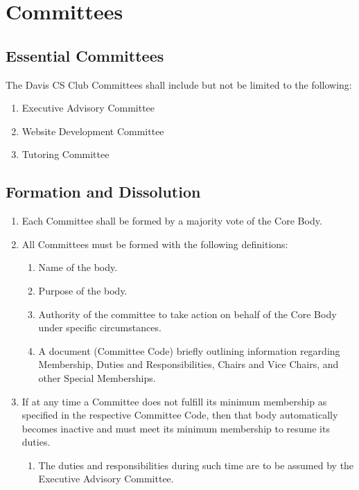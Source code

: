\documentclass{article}
\newenvironment{li}{
\begin{enumerate}
  \setlength{\itemsep}{1pt}
  \setlength{\parskip}{0pt}
  \setlength{\parsep}{0pt}
}{\end{enumerate}}
\begin{document}

\section{Committees}
\subsection{Essential Committees}
The Davis CS Club Committees shall include but not be limited to the following:
\begin{li}
\item Executive Advisory Committee
\item Website Development Committee
\item Tutoring Committee
\end{li}
\subsection{Formation and Dissolution}
\begin{li}
\item Each Committee shall be formed by a majority vote of the Core Body.
\item All Committees must be formed with the following definitions:
	\begin{li}
	\item Name of the body.
	\item Purpose of the body.
	\item Authority of the committee to take action on behalf of the Core Body under specific circumstances.
	\item A document (Committee Code) briefly outlining information regarding Membership, Duties and Responsibilities, Chairs and Vice Chairs, and other Special Memberships.
	\end{li}
\item If at any time a Committee does not fulfill its minimum membership as specified in the respective Committee Code, then that body automatically becomes inactive and must meet its minimum membership to resume its duties.
	\begin{li}
	\item The duties and responsibilities during such time are to be assumed by the Executive Advisory Committee.
	\end{li}
\end{li}
\end{document}

